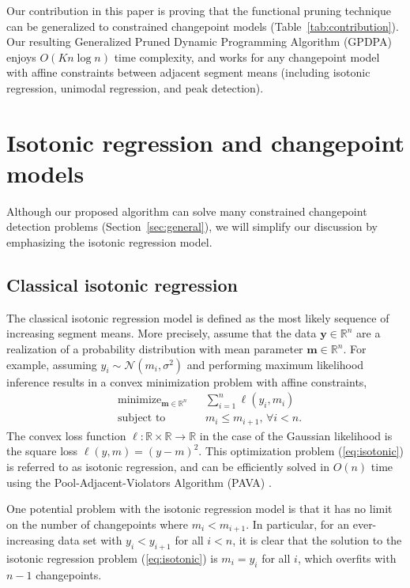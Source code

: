 \documentclass{article}
\DeclareMathOperator*{\minimize}{minimize}
\newcommand{\RR}{\mathbb R}
\begin{document}
Our contribution in this paper is proving that the functional pruning
technique can be generalized to constrained changepoint models
(Table~\ref{tab:contribution}). Our resulting Generalized Pruned
Dynamic Programming Algorithm (GPDPA) enjoys $O(Kn\log n)$ time
complexity, and works for any changepoint model with affine
constraints between adjacent segment means (including isotonic
regression, unimodal regression, and peak detection).



\section{Isotonic regression and changepoint models}
\label{sec:models}

Although our proposed algorithm can solve many constrained changepoint
detection problems (Section~\ref{sec:general}), we will simplify our
discussion by emphasizing the isotonic regression model. 

\subsection{Classical isotonic regression}

The classical isotonic regression model is defined as the most likely
sequence of increasing segment means. More
precisely, assume that the data $\mathbf y\in\RR^n$ are a realization
of a probability distribution with mean parameter $\mathbf m\in\RR^n$. For
example, assuming $y_i \sim \mathcal N(m_i, \sigma^2)$ and performing
maximum likelihood inference results in a convex minimization problem
with affine constraints,
\begin{align}
  \label{eq:isotonic}
  &\minimize_{\mathbf m\in\RR^n} && 
  \sum_{i=1}^n \ell(y_i, m_i)\\
  &\text{subject to} && m_i \leq m_{i+1},\, \forall i<n.
  \nonumber
\end{align}
The convex loss function $\ell:\RR\times \RR\rightarrow\RR$ in the
case of the Gaussian likelihood is the square loss
$\ell(y, m) = (y-m)^2$. This optimization problem (\ref{eq:isotonic})
is referred to as isotonic regression, and can be efficiently solved
in $O(n)$ time using the Pool-Adjacent-Violators Algorithm (PAVA)
\citep{isotonic-unifying}.

One potential problem with the isotonic regression model is that it
has no limit on the number of changepoints where $m_i < m_{i+1}$. In
particular, for an ever-increasing data set with $y_i < y_{i+1}$ for
all $i<n$, it is clear that the solution to the isotonic regression
problem (\ref{eq:isotonic}) is $m_i=y_i$ for all $i$, which overfits
with $n-1$ changepoints.
\end{document}
